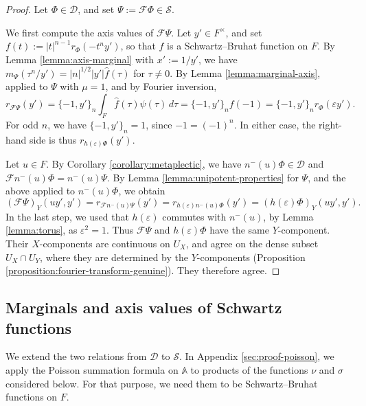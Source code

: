 \documentclass[reqno]{amsart}
\theoremstyle{plain}
\theoremstyle{definition}
\theoremstyle{itplain}
\numberwithin{equation}{section}
\numberwithin{theorem}{section}
\begin{document}
\begin{proof}
  Let $\Phi \in \mathcal{D}$, and set $\Psi := \mathcal{F} \Phi \in \mathcal{S}$.

  We first compute the axis values of $\mathcal{F} \Psi$.  Let $y' \in F^\times$, and set $f(t) := \lvert t \rvert^{n-1} r_\Phi(- t^n y')$, so that $f$ is a Schwartz--Bruhat function on $F$.  By Lemma \ref{lemma:axis-marginal} with $x' := 1 / y'$, we have $m_\Psi(\tau^n / y') = \lvert n \rvert^{1/2} \lvert y' \rvert \hat{f}(\tau)$ for $\tau \neq 0$.  By Lemma \ref{lemma:marginal-axis}, applied to $\Psi$ with $\mu = 1$, and by Fourier inversion,
  \begin{equation*}
    r_{\mathcal{F} \Psi}(y')
    = \{-1, y'\}_n \int_F \hat{f}(\tau) \psi(\tau) \, d \tau
    = \{-1, y'\}_n f(-1)
    = \{-1, y'\}_n r_\Phi(\varepsilon y').
  \end{equation*}
  For odd $n$, we have $\{-1, y'\}_n = 1$, since $-1 = (-1)^n$.  In either case, the right-hand side is thus $r_{h(\varepsilon) \Phi}(y')$.

  Let $u \in F$.  By Corollary \ref{corollary:metaplectic}, we have $n^-(u) \Phi \in \mathcal{D}$ and $\mathcal{F} n^-(u) \Phi = n^-(u) \Psi$.  By Lemma \ref{lemma:unipotent-properties} for $\Psi$, and the above applied to $n^-(u) \Phi$, we obtain
  \begin{equation*}
    (\mathcal{F} \Psi)_Y(u y', y')
    = r_{\mathcal{F} n^-(u) \Psi}(y')
    = r_{h(\varepsilon) n^-(u) \Phi}(y')
    = (h(\varepsilon) \Phi)_Y(u y', y').
  \end{equation*}
  In the last step, we used that $h(\varepsilon)$ commutes with $n^-(u)$, by Lemma \ref{lemma:torus}, as $\varepsilon^2 = 1$.  Thus $\mathcal{F} \Psi$ and $h(\varepsilon) \Phi$ have the same $Y$-component.  Their $X$-components are continuous on $U_X$, and agree on the dense subset $U_X \cap U_Y$, where they are determined by the $Y$-components (Proposition \ref{proposition:fourier-transform-genuine}).  They therefore agree.
\end{proof}

\subsection{Marginals and axis values of Schwartz functions}\label{sec:marginals-and-axis-values-of-schwartz-functions}
We extend the two relations from $\mathcal{D}$ to $\mathcal{S}$.  In Appendix \ref{sec:proof-poisson}, we apply the Poisson summation formula on $\mathbb{A}$ to products of the functions $\nu$ and $\sigma$ considered below.  For that purpose, we need them to be Schwartz--Bruhat functions on $F$.
\end{document}
